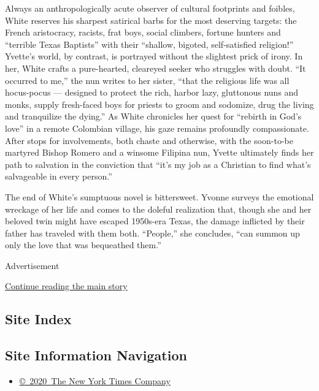 Always an anthropologically acute observer of cultural footprints and
foibles, White reserves his sharpest satirical barbs for the most
deserving targets: the French aristocracy, racists, frat boys, social
climbers, fortune hunters and ``terrible Texas Baptists'' with their
``shallow, bigoted, self-satisfied religion!'' Yvette's world, by
contrast, is portrayed without the slightest prick of irony. In her,
White crafts a pure-hearted, cleareyed seeker who struggles with doubt.
``It occurred to me,'' the nun writes to her sister, ``that the
religious life was all hocus-pocus --- designed to protect the rich,
harbor lazy, gluttonous nuns and monks, supply fresh-faced boys for
priests to groom and sodomize, drug the living and tranquilize the
dying.'' As White chronicles her quest for ``rebirth in God's love'' in
a remote Colombian village, his gaze remains profoundly compassionate.
After stops for involvements, both chaste and otherwise, with the
soon-to-be martyred Bishop Romero and a winsome Filipina nun, Yvette
ultimately finds her path to salvation in the conviction that ``it's my
job as a Christian to find what's salvageable in every person.''

The end of White's sumptuous novel is bittersweet. Yvonne surveys the
emotional wreckage of her life and comes to the doleful realization
that, though she and her beloved twin might have escaped 1950s-era
Texas, the damage inflicted by their father has traveled with them both.
``People,'' she concludes, ``can summon up only the love that was
bequeathed them.''

Advertisement

\protect\hyperlink{after-bottom}{Continue reading the main story}

\hypertarget{site-index}{%
\subsection{Site Index}\label{site-index}}

\hypertarget{site-information-navigation}{%
\subsection{Site Information
Navigation}\label{site-information-navigation}}

\begin{itemize}
\tightlist
\item
  \href{https://help.nytimes.com/hc/en-us/articles/115014792127-Copyright-notice}{©~2020~The
  New York Times Company}
\end{itemize}

